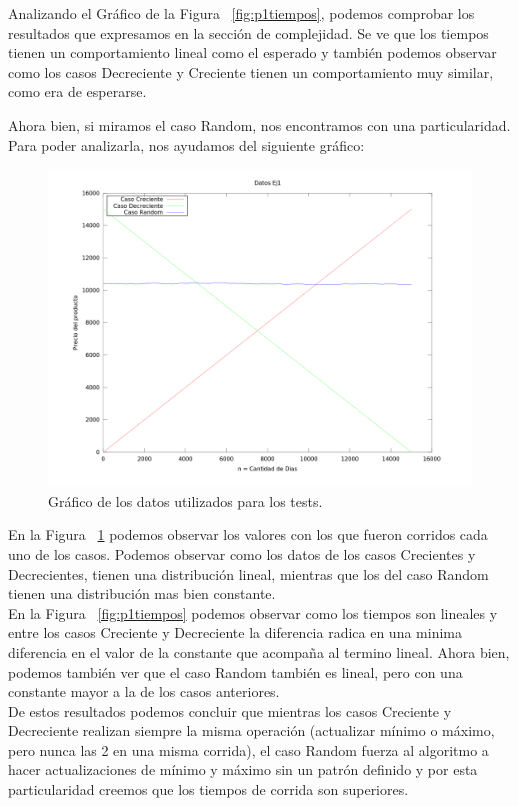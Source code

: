 \indent Analizando el Gráfico de la Figura ~\ref{fig:p1tiempos}, podemos
comprobar los resultados que expresamos en la sección de complejidad. Se ve que
los tiempos tienen un comportamiento lineal como el esperado y también podemos
observar como los casos Decreciente y Creciente tienen un comportamiento muy
similar, como era de esperarse.\\

\clearpage

\indent Ahora bien, si miramos el caso Random, nos encontramos con una
particularidad. Para poder analizarla, nos ayudamos del siguiente gráfico:

\begin{figure}[h]
\centering                                                       
        \includegraphics[width=420pt]{./figs/dataej1.png}
	\caption{Gráfico de los datos utilizados para los tests.}
	\label{fig:p1data}
\end{figure}

\indent En la Figura ~\ref{fig:p1data} podemos observar los valores con los que
fueron corridos cada uno de los casos. Podemos observar como los datos de los
casos Crecientes y Decrecientes, tienen una distribución lineal, mientras que
los del caso Random tienen una distribución mas bien constante.\\
\indent En la Figura ~\ref{fig:p1tiempos} podemos observar como los tiempos son
lineales y entre los casos Creciente y Decreciente la diferencia radica en una
minima diferencia en el valor de la constante que acompaña al termino lineal.
Ahora bien, podemos también ver que el caso Random también es lineal, pero con
una constante mayor a la de los casos anteriores.\\
\indent De estos resultados podemos concluir que mientras los casos Creciente y
Decreciente realizan siempre la misma operación (actualizar mínimo o máximo,
pero nunca las 2 en una misma corrida), el caso Random fuerza al algoritmo a
hacer actualizaciones de mínimo y máximo sin un patrón definido y por esta
particularidad creemos que los tiempos de corrida son superiores.\\











